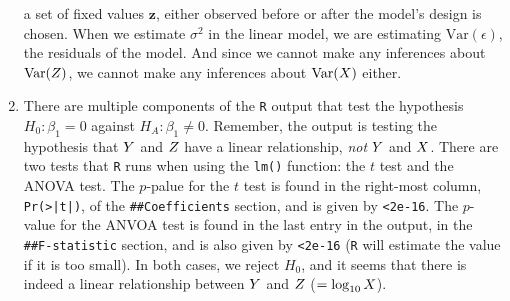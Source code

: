 \documentclass[10pt]{article}
\begin{document}
\begin{enumerate}
    a set of fixed values \(\mathbf{z}\), either observed before or after the model's design is chosen. When we estimate \(\sigma^2\) in 
    the linear model, we are estimating \(\mathrm{Var}(\epsilon)\), the residuals of the model. And since we cannot make any inferences about 
    \(\mathrm{Var}(Z)\), we cannot make any inferences about \(\mathrm{Var}(X)\) either. 
    \item There are multiple components of the \texttt{R} output that test the hypothesis \(H_0 : \beta_1 = 0\) against \(H_A : \beta_1 \neq 0\). 
    Remember, the output is testing the hypothesis that \(Y\) and \(Z\) have a linear relationship, \textsl{not} \(Y\) and \(X\). 
    There are two tests that \texttt{R} runs when using the \texttt{lm()} function: the \(t\) test and the ANOVA test. The \(p\)-palue for the \(t\) test
    is found in the right-most column, \texttt{Pr(>|t|)}, of the \texttt{\#{}\#{}Coefficients} section, and is given by \texttt{<2e-16}. 
    The \(p\)-value for the ANVOA test is found in the last entry in the output, in the \texttt{\#{}\#{}F-statistic} section, and is also given by \texttt{<2e-16}
    (\texttt{R} will estimate the value if it is too small). In both cases, we reject \(H_0\), and it seems that there is indeed a linear relationship 
    between \(Y\) and \(Z\) (\(=\log_{10}X\)). 
\end{enumerate}
\end{document}
